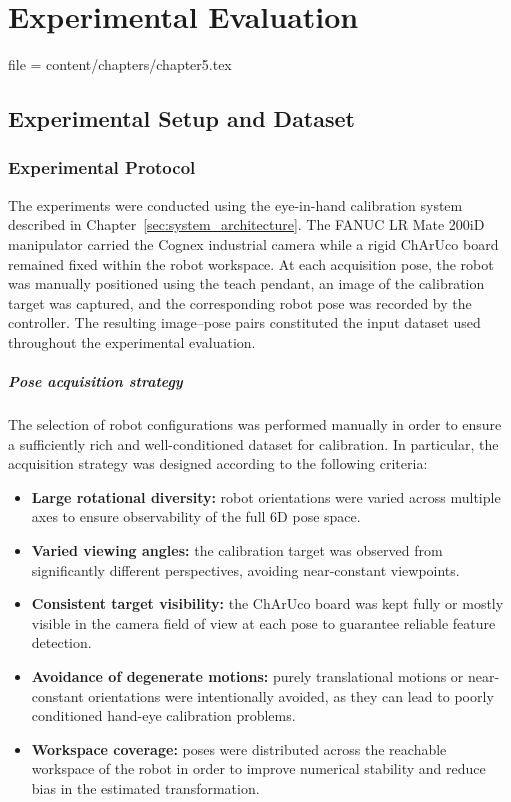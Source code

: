 \chapter{Experimental Evaluation}
\label{sec:experiental_evaluation}

file = content/chapters/chapter5.tex


\section{Experimental Setup and Dataset}


\subsection{Experimental Protocol}
\label{subsec:experimental_protocol}

The experiments were conducted using the eye-in-hand calibration system described in Chapter~\ref{sec:system_architecture}. The FANUC LR Mate 200iD manipulator carried the Cognex industrial camera while a rigid ChArUco board remained fixed within the robot workspace. At each acquisition pose, the robot was manually positioned using the teach pendant, an image of the calibration target was captured, and the corresponding robot pose was recorded by the controller. The resulting image--pose pairs constituted the input dataset used throughout the experimental evaluation.

\paragraph{Pose acquisition strategy}
The selection of robot configurations was performed manually in order to ensure a sufficiently rich and well-conditioned dataset for calibration. In particular, the acquisition strategy was designed according to the following criteria:

\begin{itemize}
	\item \textbf{Large rotational diversity:} robot orientations were varied across multiple axes to ensure observability of the full 6D pose space.
	
	\item \textbf{Varied viewing angles:} the calibration target was observed from significantly different perspectives, avoiding near-constant viewpoints.
	
	\item \textbf{Consistent target visibility:} the ChArUco board was kept fully or mostly visible in the camera field of view at each pose to guarantee reliable feature detection.
	
	\item \textbf{Avoidance of degenerate motions:} purely translational motions or near-constant orientations were intentionally avoided, as they can lead to poorly conditioned hand-eye calibration problems.
	
	\item \textbf{Workspace coverage:} poses were distributed across the reachable workspace of the robot in order to improve numerical stability and reduce bias in the estimated transformation.

	
\end{itemize}

